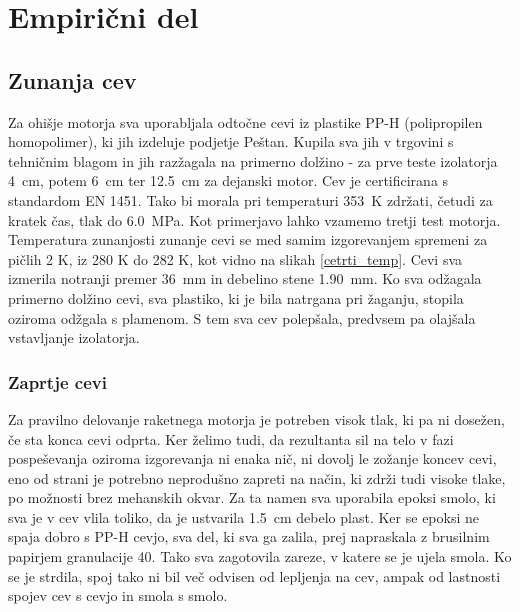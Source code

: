 \documentclass[titlepage, a4paper, twoside, final, 12pt]{article}
\begin{document}
		\section{Empirični del}
		
			\subsection{Zunanja cev}
			Za ohišje motorja sva uporabljala odtočne cevi iz plastike PP-H (polipropilen homopolimer), ki jih izdeluje podjetje Peštan. Kupila sva jih v trgovini s tehničnim blagom
			in jih razžagala na primerno dolžino - za prve teste izolatorja \SI{4}{cm}, potem \SI{6}{cm} ter \SI{12,5}{cm} za dejanski motor.
			Cev je certificirana s standardom EN 1451.\cite{Katalog_HTPP} Tako bi morala pri temperaturi \SI{353}{K} zdržati, četudi za kratek čas, tlak do \SI{6,0}{MPa}.\cite{EN1451} Kot primerjavo lahko vzamemo tretji test motorja. Temperatura zunanjosti zunanje cevi se med samim izgorevanjem spremeni za pičlih 2 K, iz 280 K do 282 K, kot vidno na slikah \ref{cetrti_temp}.
			Cevi sva izmerila notranji premer \SI{36}{mm} in debelino stene \SI{1.90}{mm}. Ko sva odžagala primerno dolžino cevi, sva plastiko,
			ki je bila natrgana pri žaganju, stopila oziroma odžgala s plamenom. 
			S tem sva cev polepšala, predvsem pa olajšala vstavljanje izolatorja.
			
				\subsubsection{Zaprtje cevi}
				Za pravilno delovanje raketnega motorja je potreben visok tlak, ki pa ni dosežen, če sta konca cevi odprta. Ker želimo tudi, da rezultanta sil na telo v fazi pospeševanja
				oziroma izgorevanja ni enaka nič, ni dovolj le zožanje koncev cevi, eno od strani je potrebno neprodušno zapreti na način, ki zdrži tudi visoke tlake, po možnosti brez
				mehanskih okvar. Za ta namen sva uporabila epoksi smolo, ki sva je v cev vlila toliko, da je ustvarila \SI{1,5}{cm} debelo plast.\cite{matweb_epoxy_cure_resin}
				Ker se epoksi ne spaja dobro s PP-H cevjo,
				sva del, ki sva ga zalila, prej napraskala z brusilnim papirjem granulacije 40.\cite{3m_lse_adhesion} Tako sva zagotovila zareze, v katere se je ujela smola.
				Ko se je strdila, spoj tako ni bil več odvisen od lepljenja na cev,
				ampak od lastnosti spojev cev s cevjo in smola s smolo. 
	 
				
			
\end{document}
